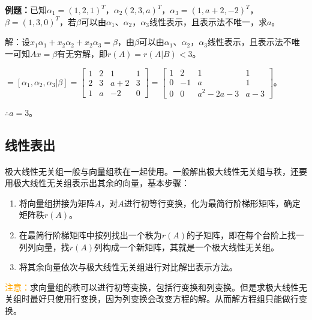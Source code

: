 \textbf{例题：}已知$\alpha_1=(1,2,1)^T$，$\alpha_2(2,3,a)^T$，$\alpha_3=(1,a+2,-2)^T$，$\beta=(1,3,0)^T$，若$\beta$可以由$\alpha_1$、$\alpha_2$，$\alpha_3$线性表示，且表示法不唯一，求$a$。

解：设$x_1\alpha_1+x_2\alpha_2+x_2\alpha_3=\beta$，由$\beta$可以由$\alpha_1$、$\alpha_2$，$\alpha_3$线性表示，且表示法不唯一可知$Ax=\beta$有无穷解，即$r(A)=r(A|B)<3$。

$=[\alpha_1,\alpha_2,\alpha_3|\beta]=\left[\begin{array}{cccc}
    1 & 2 & 1 & 1 \\
    2 & 3 & a+2 & 3 \\
    1 & a & -2 & 0
\end{array}\right]=\left[\begin{array}{cccc}
    1 & 2 & 1 & 1 \\
    0 & -1 & a & 1 \\
    0 & 0 & a^2-2a-3 & a-3
\end{array}\right]$。

$\therefore a=3$。

\subsection{线性表出}

\paragraph{}

极大线性无关组一般与向量组秩在一起使用。一般解出极大线性无关组与秩，还要用极大线性无关组表示出其余的向量，基本步骤：

\begin{enumerate}
    \item 将向量组拼接为矩阵$A$，对$A$进行初等行变换，化为最简行阶梯形矩阵，确定矩阵秩$r(A)$。
    \item 在最简行阶梯矩阵中按列找出一个秩为$r(A)$的子矩阵，即在每个台阶上找一列列向量，找$r(A)$列构成一个新矩阵，其就是一个极大线性无关组。
    \item 将其余向量依次与极大线性无关组进行对比解出表示方法。
\end{enumerate}

\textcolor{orange}{注意：}求向量组的秩可以进行初等变换，包括行变换和列变换。但是求极大线性无关组时最好只使用行变换，因为列变换会改变方程的解。从而解方程组只能做行变换。

\paragraph{}

